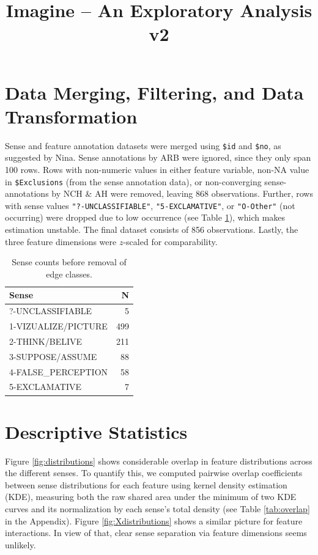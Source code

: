 \documentclass[
]{article}
\title{Imagine -- An Exploratory Analysis v2}
\author{}
\date{\vspace{-2.5em}}
\begin{document}
\maketitle

\section{Data Merging, Filtering, and Data
Transformation}\label{data-merging-filtering-and-data-transformation}

Sense and feature annotation datasets were merged using \texttt{\$id}
and \texttt{\$no}, as suggested by Nina. Sense annotations by ARB were
ignored, since they only span 100 rows. Rows with non-numeric values in
either feature variable, non-NA value in \texttt{\$Exclusions} (from the
sense annotation data), or non-converging sense-annotations by NCH \& AH
were removed, leaving 868 observations. Further, rows with sense values
\texttt{"?-UNCLASSIFIABLE"}, \texttt{"5-EXCLAMATIVE"}, or
\texttt{"O-Other"} (not occurring) were dropped due to low occurrence
(see Table \ref{tab:senseCounts}), which makes estimation unstable. The
final dataset consists of 856 observations. Lastly, the three feature
dimensions were \(z\)-scaled for comparability.

\begin{table}[H]
\centering
\caption{\label{tab:unnamed-chunk-3}\label{tab:senseCounts} Sense counts before removal of edge classes.}
\centering
\begin{tabular}[t]{lr}
\toprule
Sense & N\\
\midrule
?-UNCLASSIFIABLE & 5\\
1-VIZUALIZE/PICTURE & 499\\
2-THINK/BELIVE & 211\\
3-SUPPOSE/ASSUME & 88\\
4-FALSE\_PERCEPTION & 58\\
5-EXCLAMATIVE & 7\\
\bottomrule
\end{tabular}
\end{table}

\section{Descriptive Statistics}\label{descriptive-statistics}

Figure \ref{fig:distributions} shows considerable overlap in feature
distributions across the different senses. To quantify this, we computed
pairwise overlap coefficients between sense distributions for each
feature using kernel density estimation (KDE), measuring both the raw
shared area under the minimum of two KDE curves and its normalization by
each sense's total density (see Table \ref{tab:overlap} in the
Appendix). Figure \ref{fig:Xdistributions} shows a similar picture for
feature interactions. In view of that, clear sense separation via
feature dimensions seems unlikely.
\end{document}
